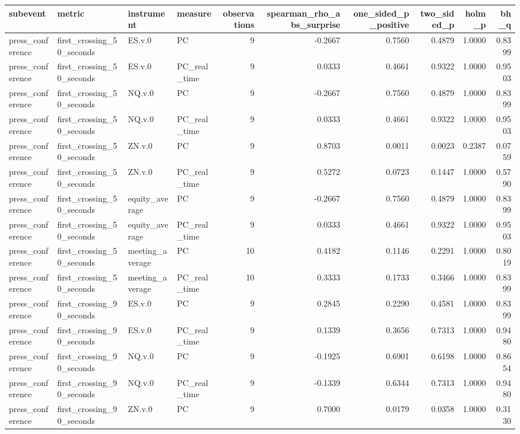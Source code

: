 \begin{tabular}{llllrrrrrr}
\toprule
subevent & metric & instrument & measure & observations & spearman_rho_abs_surprise & one_sided_p_positive & two_sided_p & holm_p & bh_q \\
\midrule
press_conference & first_crossing_50_seconds & ES.v.0 & PC & 9 & -0.2667 & 0.7560 & 0.4879 & 1.0000 & 0.8399 \\
press_conference & first_crossing_50_seconds & ES.v.0 & PC_real_time & 9 & 0.0333 & 0.4661 & 0.9322 & 1.0000 & 0.9503 \\
press_conference & first_crossing_50_seconds & NQ.v.0 & PC & 9 & -0.2667 & 0.7560 & 0.4879 & 1.0000 & 0.8399 \\
press_conference & first_crossing_50_seconds & NQ.v.0 & PC_real_time & 9 & 0.0333 & 0.4661 & 0.9322 & 1.0000 & 0.9503 \\
press_conference & first_crossing_50_seconds & ZN.v.0 & PC & 9 & 0.8703 & 0.0011 & 0.0023 & 0.2387 & 0.0759 \\
press_conference & first_crossing_50_seconds & ZN.v.0 & PC_real_time & 9 & 0.5272 & 0.0723 & 0.1447 & 1.0000 & 0.5790 \\
press_conference & first_crossing_50_seconds & equity_average & PC & 9 & -0.2667 & 0.7560 & 0.4879 & 1.0000 & 0.8399 \\
press_conference & first_crossing_50_seconds & equity_average & PC_real_time & 9 & 0.0333 & 0.4661 & 0.9322 & 1.0000 & 0.9503 \\
press_conference & first_crossing_50_seconds & meeting_average & PC & 10 & 0.4182 & 0.1146 & 0.2291 & 1.0000 & 0.8019 \\
press_conference & first_crossing_50_seconds & meeting_average & PC_real_time & 10 & 0.3333 & 0.1733 & 0.3466 & 1.0000 & 0.8399 \\
press_conference & first_crossing_90_seconds & ES.v.0 & PC & 9 & 0.2845 & 0.2290 & 0.4581 & 1.0000 & 0.8399 \\
press_conference & first_crossing_90_seconds & ES.v.0 & PC_real_time & 9 & 0.1339 & 0.3656 & 0.7313 & 1.0000 & 0.9480 \\
press_conference & first_crossing_90_seconds & NQ.v.0 & PC & 9 & -0.1925 & 0.6901 & 0.6198 & 1.0000 & 0.8654 \\
press_conference & first_crossing_90_seconds & NQ.v.0 & PC_real_time & 9 & -0.1339 & 0.6344 & 0.7313 & 1.0000 & 0.9480 \\
press_conference & first_crossing_90_seconds & ZN.v.0 & PC & 9 & 0.7000 & 0.0179 & 0.0358 & 1.0000 & 0.3130 \\

\end{tabular}
